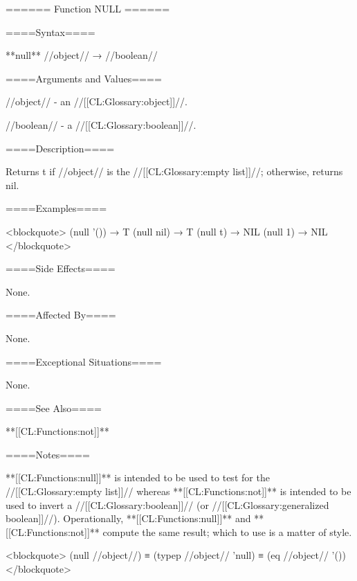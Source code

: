 ====== Function NULL ======

====Syntax====

**null** //object// → //boolean//

====Arguments and Values====

//object// - an //[[CL:Glossary:object]]//.

//boolean// - a //[[CL:Glossary:boolean]]//.

====Description====

Returns t if //object// is the //[[CL:Glossary:empty list]]//; otherwise, returns nil.

====Examples====

<blockquote> (null '()) → T (null nil) → T (null t) → NIL (null 1) → NIL </blockquote>

====Side Effects====

None.

====Affected By====

None.

====Exceptional Situations====

None.

====See Also====

**[[CL:Functions:not]]**

====Notes====

**[[CL:Functions:null]]** is intended to be used to test for the //[[CL:Glossary:empty list]]// whereas **[[CL:Functions:not]]** is intended to be used to invert a //[[CL:Glossary:boolean]]// (or //[[CL:Glossary:generalized boolean]]//). Operationally, **[[CL:Functions:null]]** and **[[CL:Functions:not]]** compute the same result; which to use is a matter of style.

<blockquote> (null //object//) ≡ (typep //object// 'null) ≡ (eq //object// '()) </blockquote>

